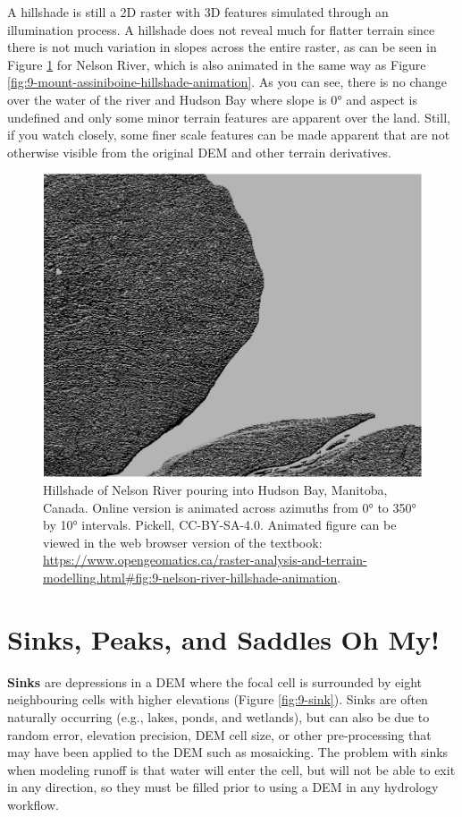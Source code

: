 \documentclass[
]{book}
\begin{document}
A hillshade is still a 2D raster with 3D features simulated through an illumination process. A hillshade does not reveal much for flatter terrain since there is not much variation in slopes across the entire raster, as can be seen in Figure \ref{fig:9-nelson-river-hillshade-animation} for Nelson River, which is also animated in the same way as Figure \ref{fig:9-mount-assiniboine-hillshade-animation}. As you can see, there is no change over the water of the river and Hudson Bay where slope is 0° and aspect is undefined and only some minor terrain features are apparent over the land. Still, if you watch closely, some finer scale features can be made apparent that are not otherwise visible from the original DEM and other terrain derivatives.



\begin{figure}
\includegraphics[width=0.75\linewidth]{images/09-nelson-river-hillshade-animation-static} \caption{Hillshade of Nelson River pouring into Hudson Bay, Manitoba, Canada. Online version is animated across azimuths from 0° to 350° by 10° intervals. Pickell, CC-BY-SA-4.0. Animated figure can be viewed in the web browser version of the textbook: \url{https://www.opengeomatics.ca/raster-analysis-and-terrain-modelling.html\#fig:9-nelson-river-hillshade-animation}.}\label{fig:9-nelson-river-hillshade-animation}
\end{figure}

\section{Sinks, Peaks, and Saddles Oh My!}\label{sinks-peaks-and-saddles-oh-my}

\textbf{Sinks} are depressions in a DEM where the focal cell is surrounded by eight neighbouring cells with higher elevations (Figure \ref{fig:9-sink}). Sinks are often naturally occurring (e.g., lakes, ponds, and wetlands), but can also be due to random error, elevation precision, DEM cell size, or other pre-processing that may have been applied to the DEM such as mosaicking. The problem with sinks when modeling runoff is that water will enter the cell, but will not be able to exit in any direction, so they must be filled prior to using a DEM in any hydrology workflow.
\end{document}
